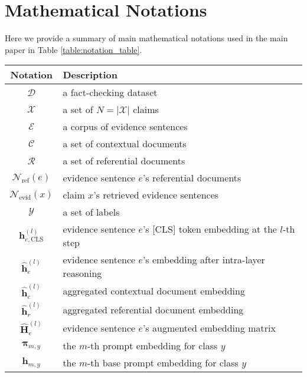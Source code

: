 \section{Mathematical Notations}
\label{sec:notations}

Here we provide a summary of main mathematical notations used in the main paper in Table \ref{table:notation_table}.

\begin{table*}[t]
	\centering
	\caption{Summary of mathematical notations.}
		\begin{tabular}{c|l}
			\toprule
			Notation  & Description  \\
			\hline
			$ \mathcal{D} $ & a fact-checking dataset \\
			$ \mathcal{X} $ & a set of $ N=|\mathcal{X}| $ claims \\
			$ \mathcal{E} $ & a corpus of evidence sentences \\
			$ \mathcal{C} $ & a set of contextual documents \\
                $ \mathcal{R} $ & a set of referential documents \\
			$ \mathcal{N}_{\text{ref}}(e) $ & evidence sentence $ e $'s referential documents \\
                $ \mathcal{N}_{\text{evid}}(x) $ & claim $ x $'s retrieved evidence sentences \\
                $ \mathcal{Y} $ & a set of labels \\
                $ \textbf{h}_{e,\text{CLS}}^{(l)} $ & evidence sentence $ e $'s [CLS] token embedding at the $ l $-th step \\
                $ \hat{\textbf{h}}_{e}^{(l)} $ & evidence sentence $ e $'s embedding after intra-layer reasoning \\
                $ \hat{\textbf{h}}_{c}^{(l)} $ & aggregated contextual document embedding \\
                $ \hat{\textbf{h}}_{r}^{(l)} $ & aggregated referential document embedding \\
                $ \widehat{\textbf{H}}_{e}^{(l)} $ & evidence sentence $ e $'s augmented embedding matrix \\
                $ \bm{\pi}_{m,y} $ & the $ m $-th prompt embedding for class $ y $ \\
                $ \textbf{h}_{m,y} $ & the $ m $-th base prompt embedding for class $ y $ \\
			\bottomrule
		\end{tabular}
	\label{table:notation_table}
\end{table*}